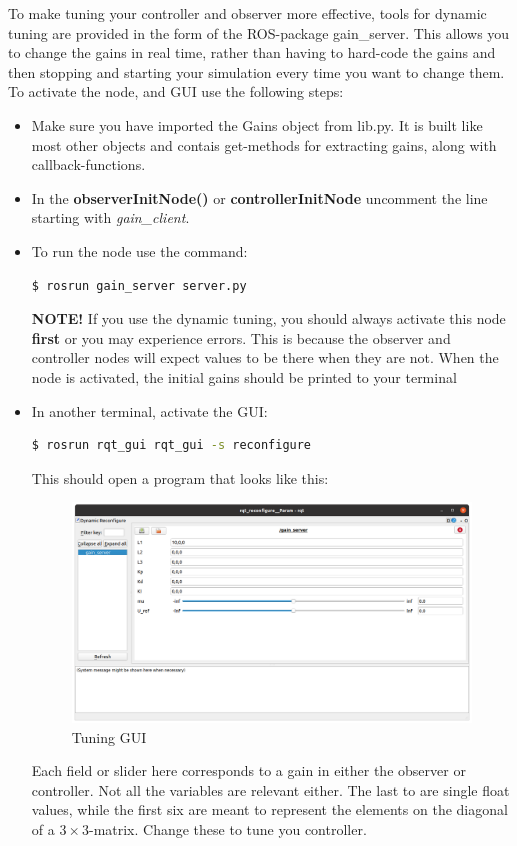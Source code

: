 To make tuning your controller and observer more effective, tools for dynamic tuning are provided in the form of the ROS-package gain\_server. This allows you to change the gains in real time, rather than having to hard-code the gains and then stopping and starting your simulation every time you want to change them. To activate the node, and GUI use the following steps: 

\begin{itemize}
    \item Make sure you have imported the Gains object from lib.py. It is built like most other objects and contais get-methods for extracting gains, along with callback-functions.
    \item In the \textbf{observerInitNode()} or \textbf{controllerInitNode} uncomment the line starting with \textit{gain\_client}.
    \item To run the node use the command:
    \begin{lstlisting}[language=bash,basicstyle=\mlttfamily, breaklines=true]
    $ rosrun gain_server server.py
    \end{lstlisting}
    \textbf{NOTE!} If you use the dynamic tuning, you should always activate this node \textbf{first} or you may experience errors. This is because the observer and controller nodes will expect values to be there when they are not. When the node is activated, the initial gains should be printed to your terminal
    \item In another terminal, activate the GUI: 
     \begin{lstlisting}[language=bash,basicstyle=\mlttfamily, breaklines=true]
    $ rosrun rqt_gui rqt_gui -s reconfigure
    \end{lstlisting}
    
    This should open a program that looks like this: 
    
    \begin{figure}[h]
        \centering
        \includegraphics[width=\textwidth]{fig/dynamic-reconfigure(1).png}
        \caption{Tuning GUI}
        \label{fig:tuner}
    \end{figure}
    
    Each field or slider here corresponds to a gain in either the observer or controller. Not all the variables are relevant either. The last to are single float values, while the first six are meant to represent the elements on the diagonal of a $3\times3$-matrix. Change these to tune you controller. 
\end{itemize}

